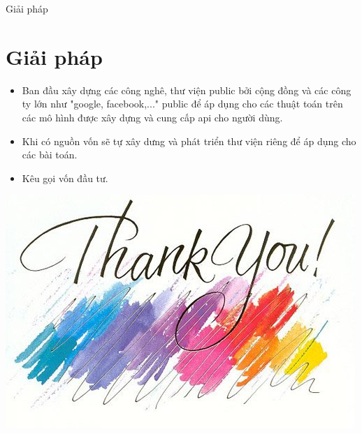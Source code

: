 \documentclass{beamer}
\begin{document}
\begin{frame}{Giải pháp}
\section{Giải pháp}
\begin{itemize}
\item Ban đầu xây dựng các công nghê, thư viện public bởi cộng đồng và các công ty lớn như "google, facebook,..." public để áp dụng cho các thuật toán trên các mô hình được xây dựng và cung cấp api cho người dùng.
\item Khi có nguồn vốn sẽ tự xây dưng và phát triển thư viện riêng để áp dụng cho các bài toán.
\item Kêu gọi vốn đầu tư.
\end{itemize}
\end{frame}
\begin{frame}
\begin{center}
\includegraphics[scale=0.4]{thanks.jpg}\\
\end{center}
\end{frame}
\end{document}
